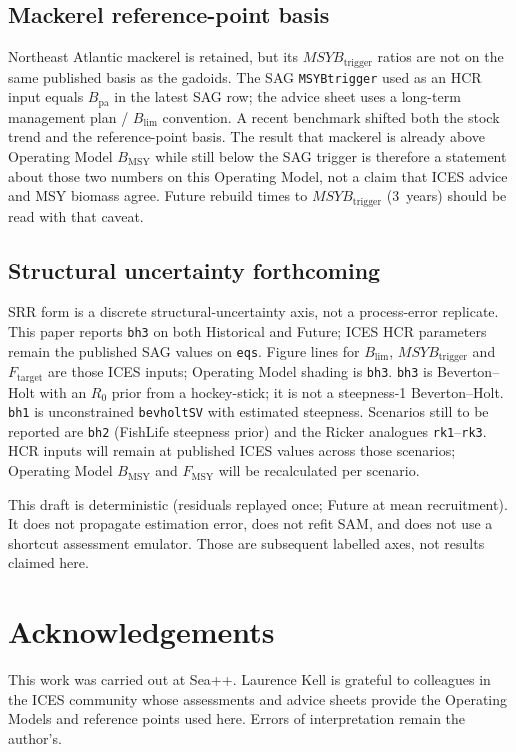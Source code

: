 \documentclass[11pt,a4paper]{article}
\newcommand{\Fmsy}{F_{\mathrm{MSY}}}
\newcommand{\Blim}{B_{\lim}}
\newcommand{\Btrig}{MSYB_{\mathrm{trigger}}}
\newcommand{\Bmsy}{B_{\mathrm{MSY}}}
\begin{document}
\subsection{Mackerel reference-point basis}

Northeast Atlantic mackerel is retained, but its $\Btrig$ ratios are not
on the same published basis as the gadoids. The SAG \texttt{MSYBtrigger}
used as an HCR input equals $B_{\mathrm{pa}}$ in the latest SAG row;
the advice sheet uses a long-term management plan / $\Blim$ convention.
A recent benchmark shifted both the stock trend and the reference-point
basis. The result that mackerel is already above Operating Model
$\Bmsy$ while still below the SAG trigger is therefore a statement about
those two numbers on this Operating Model, not a claim that ICES advice
and MSY biomass agree. Future rebuild times to $\Btrig$ (3~years)
should be read with that caveat.

\subsection{Structural uncertainty forthcoming}

SRR form is a discrete structural-uncertainty axis, not a process-error
replicate. This paper reports \texttt{bh3} on both Historical and Future;
ICES HCR parameters remain the published SAG values on \texttt{eqs}.
Figure lines for $\Blim$, $\Btrig$ and $F_{\mathrm{target}}$ are those
ICES inputs; Operating Model shading is \texttt{bh3}. \texttt{bh3} is
Beverton--Holt with an $R_0$ prior from a hockey-stick; it is not a
steepness-1 Beverton--Holt. \texttt{bh1} is unconstrained
\texttt{bevholtSV} with estimated steepness. Scenarios still to be reported
are \texttt{bh2} (FishLife steepness prior) and the Ricker analogues
\texttt{rk1}--\texttt{rk3}. HCR inputs will remain at published ICES
values across those scenarios; Operating Model $\Bmsy$ and $\Fmsy$ will
be recalculated per scenario.

This draft is deterministic (residuals replayed once; Future at mean
recruitment). It does not propagate estimation error, does not refit
SAM, and does not use a shortcut assessment emulator. Those are
subsequent labelled axes, not results claimed here.

\section*{Acknowledgements}

This work was carried out at Sea++. Laurence Kell is grateful to
colleagues in the ICES community whose assessments and advice sheets
provide the Operating Models and reference points used here. Errors of
interpretation remain the author's.



\end{document}
